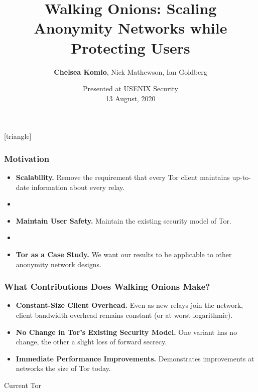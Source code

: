 \documentclass[hyperref={pdfpagelabels=true},table,dvipsnames,14pt,aspectratio=169]{beamer}
\title[Walking Onions]{Walking Onions: Scaling Anonymity Networks while Protecting Users}
\author{\textbf{Chelsea Komlo}, Nick Mathewson, Ian Goldberg}
\date{Presented at USENIX Security \\ 13 August, 2020}
\begin{document}
[triangle]

\begin{frame}
        \thispagestyle{empty}
        \maketitle
\end{frame}

\begin{frame}
\frametitle{Motivation}
  \begin{itemize}
    \item<1-> \textbf{Scalability.} Remove the requirement that every
      Tor client maintains up-to-date information about every relay.
    \item<1->[]~
    \item<2-> \textbf{Maintain User Safety.} Maintain the existing security model of Tor.
    \item<2->[]~
    \item<3> \textbf{Tor as a Case Study.} We want our results to be applicable
      to other anonymity network designs.
  \end{itemize}
\end{frame}


\begin{frame}
\frametitle{What Contributions Does Walking Onions Make?}
  \begin{itemize}
    \item<1-> \textbf{Constant-Size Client Overhead.} Even
      as new relays join the network, client bandwidth overhead remains
      constant (or at worst logarithmic).
    \item<2-> \textbf{No Change in Tor's Existing Security Model.} One variant has no change,
      the other a slight loss of forward secrecy.
    \item<3-> \textbf{Immediate Performance Improvements.} Demonstrates
      improvements at networks the size of Tor today.
  \end{itemize}
\end{frame}

\begin{frame}
  \centering
  \huge
  Current Tor
\end{frame}
\end{document}

